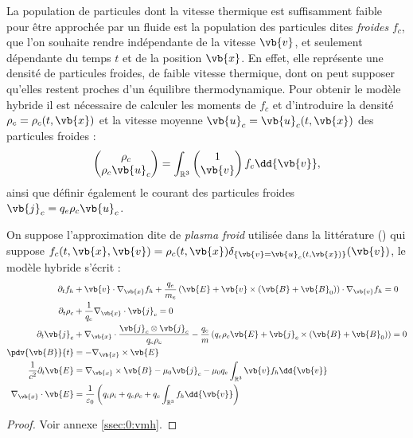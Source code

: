 La population de particules dont la vitesse thermique est suffisamment faible pour être approchée par un fluide est la population des particules dites \emph{froides} $f_c$, que l'on souhaite rendre indépendante de la vitesse $\vb{v}$, et seulement dépendante du temps $t$ et de la position $\vb{x}$. En effet, elle représente une densité de particules froides, de faible vitesse thermique, dont on peut supposer qu'elles restent proches d'un équilibre thermodynamique. Pour obtenir le modèle hybride il est nécessaire de calculer les moments de $f_c$ et d'introduire la densité $\rho_c=\rho_c(t,\vb{x})$ et la vitesse moyenne $\vb{u}_c=\vb{u}_c(t,\vb{x})$ des particules froides :
$$
  \begin{pmatrix}
    \rho_c \\
    \rho_c \vb{u}_c
  \end{pmatrix}
  =
  \int_{\mathbb{R}^3} \begin{pmatrix}
    1 \\
    \vb{v}
  \end{pmatrix} f_c\dd{\vb{v}},
$$
ainsi que définir également le courant des particules froides $\vb{j}_c = q_e\rho_c\vb{u}_c$.

\begin{pro}
  \label{pro:0:vmh}
  On suppose l'approximation dite de \emph{plasma froid} utilisée dans la littérature (\cite{Tronci:2014,Holderied:2019}) qui suppose $f_c(t,\vb{x},\vb{v}) = \rho_c(t,\vb{x})\delta_{\{\vb{v}=\vb{u}_c(t,\vb{x})\}}(\vb{v})$, le modèle hybride s'écrit :
  \begin{align}
    \label{eq:0:vmh:1}
      \partial_t f_h &+ \vb{v}\cdot\nabla_{\vb{x}} f_h + \frac{q_e}{m_e}\left( \vb{E} + \vb{v}\times(\vb{B}+\vb{B}_0) \right)\cdot\nabla_{\vb{v}} f_h = 0 \\
    \label{eq:0:vmh:2}
      \partial_t\rho_c &+ \frac{1}{q_e}\nabla_{\vb{x}}\cdot\vb{j}_c = 0 \\
    \label{eq:0:vmh:3}
      \partial_t\vb{j}_c &+ \nabla_{\vb{x}}\cdot\frac{\vb{j}_c\otimes\vb{j}_c}{q_e\rho_c} - \frac{q_e}{m}\left( q_e\rho_c\vb{E} + \vb{j}_c\times(\vb{B}+\vb{B}_0) \right) = 0 \\
    \label{eq:0:vmh:4}
      \pdv{\vb{B}}{t} &= - \nabla_{\vb{x}}\times\vb{E} \\
    \label{eq:0:vmh:5}
      \frac{1}{c^2}\partial_t\vb{E} &= \nabla_{\vb{x}}\times \vb{B} - \mu_0\vb{j}_c - \mu_0 q_e\int_{\mathbb{R}^3} \vb{v} f_h\dd{\vb{v}} \\
    \label{eq:0:vmh:6}
      \nabla_{\vb{x}}\cdot\vb{E} &= \frac{1}{\varepsilon_0}\left( q_i\rho_i + q_e\rho_c + q_e\int_{\mathbb{R}^3} f_h\dd{\vb{v}} \right)
  \end{align}
\end{pro}
\begin{proof}
  Voir annexe \ref{ssec:0:vmh}.
\end{proof}

